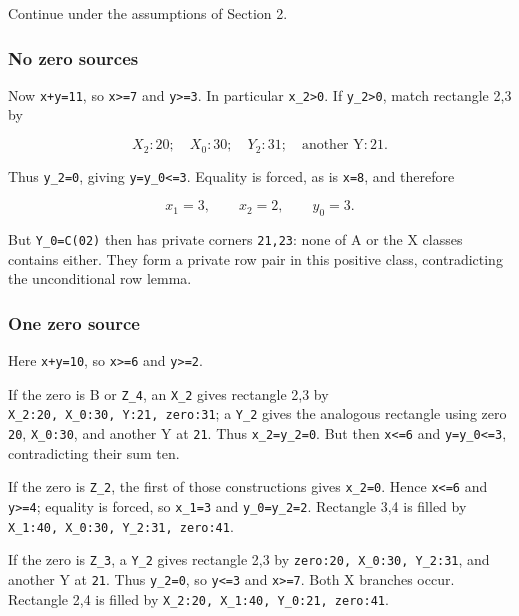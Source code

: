 \documentclass[
  10pt,
]{article}
\begin{document}
Continue under the assumptions of Section 2.

\hypertarget{no-zero-sources}{%
\subsubsection*{No zero sources}\label{no-zero-sources}}

Now \texttt{x+y=11}, so \texttt{x\textgreater{}=7} and
\texttt{y\textgreater{}=3}. In particular \texttt{x\_2\textgreater{}0}.
If \texttt{y\_2\textgreater{}0}, match rectangle 2,3 by

\[
X_2:20;\quad X_0:30;\quad Y_2:31;\quad
\text{another Y}:21.
\]

Thus \texttt{y\_2=0}, giving \texttt{y=y\_0\textless{}=3}. Equality is
forced, as is \texttt{x=8}, and therefore

\[
x_1=3,\qquad x_2=2,\qquad y_0=3.
\]

But \texttt{Y\_0=C(02)} then has private corners \texttt{21,23}: none of
A or the X classes contains either. They form a private row pair in this
positive class, contradicting the unconditional row lemma.

\hypertarget{one-zero-source}{%
\subsubsection*{One zero source}\label{one-zero-source}}

Here \texttt{x+y=10}, so \texttt{x\textgreater{}=6} and
\texttt{y\textgreater{}=2}.

If the zero is B or \texttt{Z\_4}, an \texttt{X\_2} gives rectangle 2,3
by \texttt{X\_2:20,\ X\_0:30,\ Y:21,\ zero:31}; a \texttt{Y\_2} gives
the analogous rectangle using zero \texttt{20}, \texttt{X\_0:30}, and
another Y at \texttt{21}. Thus \texttt{x\_2=y\_2=0}. But then
\texttt{x\textless{}=6} and \texttt{y=y\_0\textless{}=3}, contradicting
their sum ten.

If the zero is \texttt{Z\_2}, the first of those constructions gives
\texttt{x\_2=0}. Hence \texttt{x\textless{}=6} and
\texttt{y\textgreater{}=4}; equality is forced, so \texttt{x\_1=3} and
\texttt{y\_0=y\_2=2}. Rectangle 3,4 is filled by
\texttt{X\_1:40,\ X\_0:30,\ Y\_2:31,\ zero:41}.

If the zero is \texttt{Z\_3}, a \texttt{Y\_2} gives rectangle 2,3 by
\texttt{zero:20,\ X\_0:30,\ Y\_2:31}, and another Y at \texttt{21}. Thus
\texttt{y\_2=0}, so \texttt{y\textless{}=3} and
\texttt{x\textgreater{}=7}. Both X branches occur. Rectangle 2,4 is
filled by \texttt{X\_2:20,\ X\_1:40,\ Y\_0:21,\ zero:41}.
\end{document}
